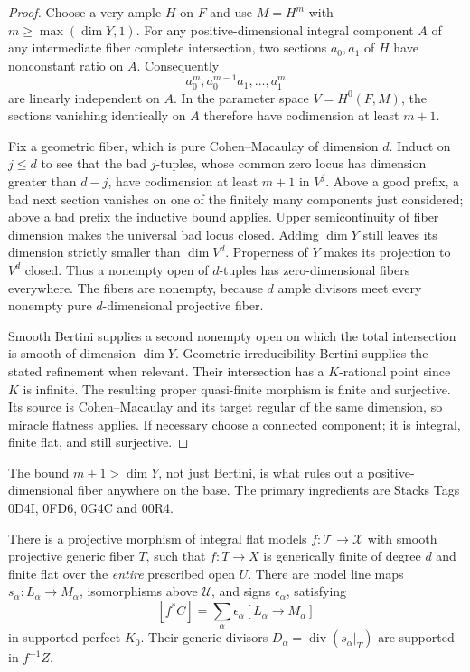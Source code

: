 \begin{proof}
Choose a very ample $H$ on $F$ and use $M=H^m$ with
$m\geq\max(\dim Y,1)$.  For any positive-dimensional integral component
$A$ of any intermediate fiber complete intersection, two sections
$a_0,a_1$ of $H$ have nonconstant ratio on $A$.  Consequently
\[
                    a_0^m,a_0^{m-1}a_1,\ldots,a_1^m
\]
are linearly independent on $A$.  In the parameter space
$V=H^0(F,M)$, the sections vanishing identically on $A$ therefore
have codimension at least $m+1$.

Fix a geometric fiber, which is pure Cohen--Macaulay of dimension $d$.
Induct on $j\leq d$ to see that the bad $j$-tuples, whose common
zero locus has dimension greater than $d-j$, have codimension at least
$m+1$ in $V^j$.  Above a good prefix, a bad next section vanishes
on one of the finitely many components just considered; above a bad
prefix the inductive bound applies.  Upper semicontinuity of fiber
dimension makes the universal bad locus closed.  Adding $\dim Y$
still leaves its dimension strictly smaller than $\dim V^d$.
Properness of $Y$ makes its projection to $V^d$ closed.  Thus a
nonempty open of $d$-tuples has zero-dimensional fibers everywhere.
The fibers are nonempty, because $d$ ample divisors meet every
nonempty pure $d$-dimensional projective fiber.

Smooth Bertini supplies a second nonempty open on which the total
intersection is smooth of dimension $\dim Y$.  Geometric irreducibility
Bertini supplies the stated refinement when relevant.  Their intersection
has a $K$-rational point since $K$ is infinite.  The resulting proper
quasi-finite morphism is finite and surjective.  Its source is
Cohen--Macaulay and its target regular of the same dimension, so
miracle flatness applies.  If necessary choose a connected component;
it is integral, finite flat, and still surjective.
\end{proof}

The bound $m+1>\dim Y$, not just Bertini, is what rules out a
positive-dimensional fiber anywhere on the base.  The primary
ingredients are Stacks Tags 0D4I, 0FD6, 0G4C and 00R4.

\begin{lemma}
\label{r11p:relative-lines}
There is a projective morphism of integral flat models
$f:\mathcal T\to\mathcal X$ with smooth projective generic fiber $T$,
such that $f:T\to X$ is generically finite of degree $d$ and finite
flat over the \emph{entire} prescribed open $U$.  There are model
line maps $s_\alpha:L_\alpha\to M_\alpha$, isomorphisms above
$\mathcal U$, and signs $\epsilon_\alpha$, satisfying
\[
                 [f^*C]
                   =\sum_\alpha\epsilon_\alpha[L_\alpha\to M_\alpha]
\tag{PC2}\label{r11p:supported-k-equality}
\]
in supported perfect $K_0$.  Their generic divisors
$D_\alpha=\operatorname{div}(s_\alpha|_T)$ are supported in $f^{-1}Z$.
\end{lemma}

